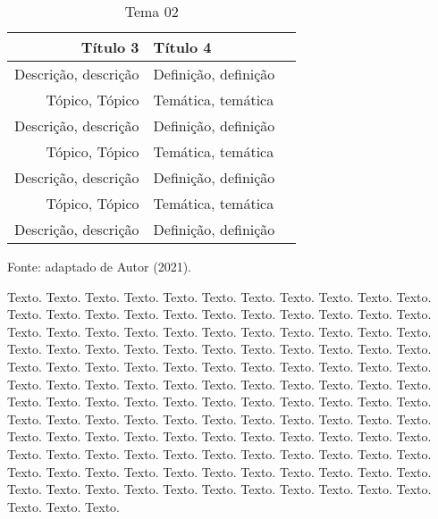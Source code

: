 \begin{onehalfspacing}
    \renewcommand\tabularxcolumn[1]{>{\Centering}m{#1}} 
    \begin{table}[ht]
        \begin{center}
            \begin{large}
                \caption{Tema 02}
                \begin{tabular}{r|lr}
                    \hline
                    \textbf{Título 3} & \textbf{Título 4} \\
                    \hline
                    Descrição, descrição & Definição, definição \\
                    Tópico, Tópico & Temática, temática \\
                    Descrição, descrição & Definição, definição   \\
                    Tópico, Tópico & Temática, temática \\
                    Descrição, descrição & Definição, definição \\
                    Tópico, Tópico & Temática, temática   \\
                    Descrição, descrição & Definição, definição \\
                    \hline
                \end{tabular}
            \end{large}
        \end{center}
            \begin{small}
                Fonte: adaptado de Autor (2021).
            \end{small}
        \end{table}
\end{onehalfspacing}

\begin{onehalfspacing}
    \begin{justify}
        \begin{large}
            Texto. Texto. Texto. Texto. Texto. Texto. Texto. Texto. Texto. Texto. Texto. Texto. Texto. Texto. Texto. Texto. Texto. Texto. Texto. Texto. Texto. Texto. Texto. Texto. Texto. Texto. Texto. Texto. Texto. Texto. Texto. Texto. Texto. Texto. Texto. Texto. Texto. Texto. Texto. Texto. Texto. Texto. Texto. Texto. Texto. Texto. Texto. Texto. Texto. Texto. Texto. Texto. Texto. Texto. Texto. Texto. Texto. Texto. Texto. Texto. Texto. Texto. Texto. Texto. Texto. Texto. Texto. Texto. Texto. Texto. Texto. Texto. Texto. Texto. Texto. Texto. Texto. Texto. Texto. Texto. Texto. Texto. Texto. Texto. Texto. Texto. Texto. Texto. Texto. Texto. Texto. Texto. Texto. Texto. Texto. Texto. Texto. Texto. Texto. Texto. Texto. Texto. Texto. Texto. Texto. Texto. Texto. Texto. Texto. Texto. Texto. Texto. Texto. Texto. Texto. Texto. Texto. Texto. Texto. Texto. Texto. Texto. Texto. Texto. Texto. Texto. Texto. Texto. Texto. Texto. Texto. Texto. Texto. Texto. Texto.\vfill
        \end{large}
    \end{justify}
\end{onehalfspacing}\pagebreak